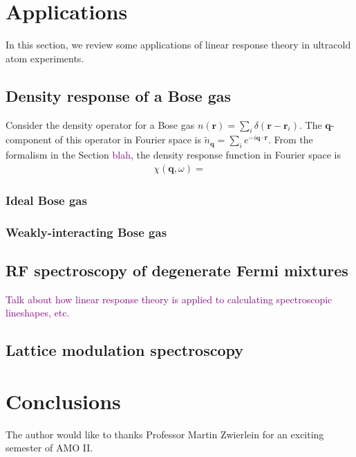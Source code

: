 \documentclass[reprint,
nofootinbib,
amsmath,amssymb,
aps]{revtex4-1}
\begin{document}
\section{Applications}

In this section, we review some applications of linear response theory in ultracold atom experiments. 
 
\subsection{Density response of a Bose gas}

Consider the density operator for a Bose gas $n(\mathbf{r}) = \sum_i \delta(\mathbf{r} - \mathbf{r}_i)$. The $\mathbf{q}$-component of this operator in Fourier space is $\widetilde{n}_\mathbf{q} = \sum_i e^{-i \mathbf{q}\cdot \mathbf{r}}$. From the formalism in the Section \textcolor{purple}{blah}, the density response function in Fourier space is
\begin{align*}
\chi(\mathbf{q},\omega) = 
\end{align*}
\subsubsection{Ideal Bose gas}

\subsubsection{Weakly-interacting Bose gas}


\subsection{RF spectroscopy of degenerate Fermi mixtures}


\textcolor{purple}{Talk about how linear response theory is applied to calculating spectroscopic lineshapes, etc.}

\subsection{Lattice modulation spectroscopy}




\section{Conclusions}



\begin{acknowledgments}
	The author would like to thanks Professor Martin Zwierlein for an exciting semester of AMO II. 
\end{acknowledgments}



%  
\end{document}
